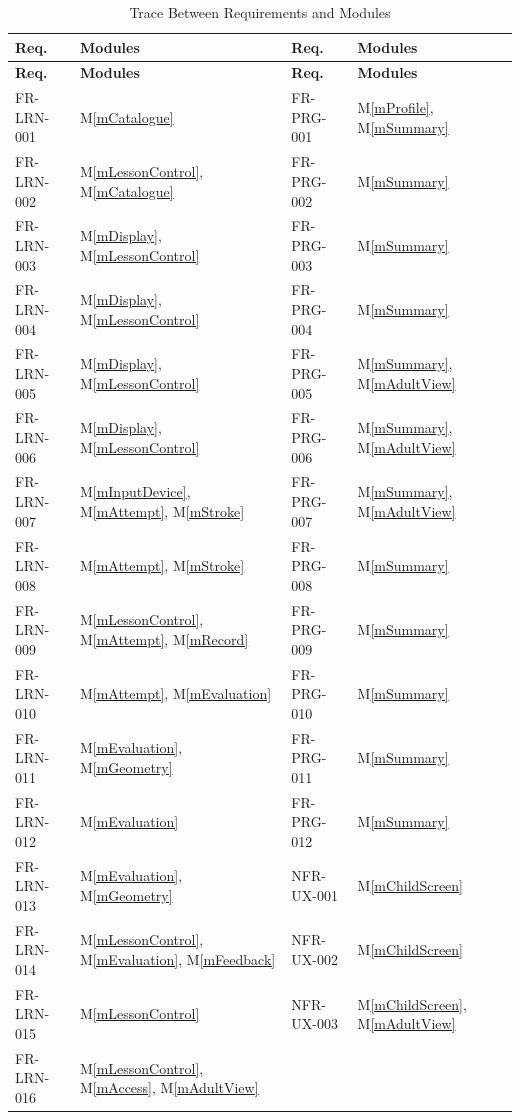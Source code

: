 \documentclass[12pt, titlepage]{article}
\newcommand{\mref}[1]{M\ref{#1}}
\begin{document}
{\small
\begin{longtable}{@{}p{} p{} p{}
p{}@{}}
\caption{Trace Between Requirements and Modules}
\label{TblRT}\\
\toprule
\textbf{Req.} & \textbf{Modules} & \textbf{Req.} & \textbf{Modules}\\
\midrule
\endfirsthead
\toprule
\textbf{Req.} & \textbf{Modules} & \textbf{Req.} & \textbf{Modules}\\
\midrule
\endhead
\bottomrule
\endlastfoot
FR-LRN-001 & \mref{mCatalogue} &
  FR-PRG-001 & \mref{mProfile}, \mref{mSummary}\\
FR-LRN-002 & \mref{mLessonControl}, \mref{mCatalogue} &
  FR-PRG-002 & \mref{mSummary}\\
FR-LRN-003 & \mref{mDisplay}, \mref{mLessonControl} &
  FR-PRG-003 & \mref{mSummary}\\
FR-LRN-004 & \mref{mDisplay}, \mref{mLessonControl} &
  FR-PRG-004 & \mref{mSummary}\\
FR-LRN-005 & \mref{mDisplay}, \mref{mLessonControl} &
  FR-PRG-005 & \mref{mSummary}, \mref{mAdultView}\\
FR-LRN-006 & \mref{mDisplay}, \mref{mLessonControl} &
  FR-PRG-006 & \mref{mSummary}, \mref{mAdultView}\\
FR-LRN-007 & \mref{mInputDevice}, \mref{mAttempt}, \mref{mStroke} &
  FR-PRG-007 & \mref{mSummary}, \mref{mAdultView}\\
FR-LRN-008 & \mref{mAttempt}, \mref{mStroke} &
  FR-PRG-008 & \mref{mSummary}\\
FR-LRN-009 & \mref{mLessonControl}, \mref{mAttempt}, \mref{mRecord} &
  FR-PRG-009 & \mref{mSummary}\\
FR-LRN-010 & \mref{mAttempt}, \mref{mEvaluation} &
  FR-PRG-010 & \mref{mSummary}\\
FR-LRN-011 & \mref{mEvaluation}, \mref{mGeometry} &
  FR-PRG-011 & \mref{mSummary}\\
FR-LRN-012 & \mref{mEvaluation} &
  FR-PRG-012 & \mref{mSummary}\\
FR-LRN-013 & \mref{mEvaluation}, \mref{mGeometry} &
  NFR-UX-001 & \mref{mChildScreen}\\
FR-LRN-014 & \mref{mLessonControl}, \mref{mEvaluation}, \mref{mFeedback} &
  NFR-UX-002 & \mref{mChildScreen}\\
FR-LRN-015 & \mref{mLessonControl} &
  NFR-UX-003 & \mref{mChildScreen}, \mref{mAdultView}\\
FR-LRN-016 & \mref{mLessonControl}, \mref{mAccess}, \mref{mAdultView} &

\end{longtable}}
\end{document}
